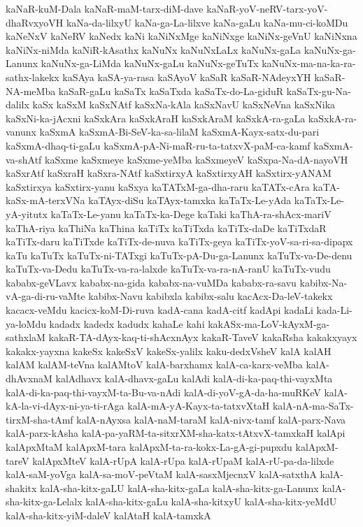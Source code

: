 {kaNaR-kuM-Dala
kaNaR-maM-tarx-diM-dave
kaNaR-yoV-neRV-tarx-yoV-dhaRvxyoVH
kaNa-da-lilxyU
kaNa-ga-La-lilxve
kaNa-gaLu
kaNa-mu-ci-koMDu
kaNeNxV
kaNeRV
kaNedx
kaNi
kaNiNxMge
kaNiNxge
kaNiNx-geVnU
kaNiNxna
kaNiNx-niMda
kaNiR-kAsathx
kaNuNx
kaNuNxLaLx
kaNuNx-gaLa
kaNuNx-ga-Lanunx
kaNuNx-ga-LiMda
kaNuNx-gaLu
kaNuNx-geTuTx
kaNuNx-ma-na-ka-ra-sathx-lakekx
kaSAya
kaSA-ya-rasa
kaSAyoV
kaSaR
kaSaR-NAdeyxYH
kaSaR-NA-meMba
kaSaR-gaLu
kaSaTx
kaSaTxda
kaSaTx-do-La-giduR
kaSaTx-gu-Na-dalilx
kaSx
kaSxM
kaSxNAtf
kaSxNa-kAla
kaSxNavU
kaSxNeVna
kaSxNika
kaSxNi-ka-jAcxni
kaSxkAra
kaSxkAraH
kaSxkAraM
kaSxkA-ra-gaLa
kaSxkA-ra-vanunx
kaSxmA
kaSxmA-Bi-SeV-ka-sa-lilaM
kaSxmA-Kayx-satx-du-pari
kaSxmA-dhaq-ti-gaLu
kaSxmA-pA-Ni-maR-ru-ta-tatxvX-paM-ca-kamf
kaSxmA-va-shAtf
kaSxme
kaSxmeye
kaSxme-yeMba
kaSxmeyeV
kaSxpa-Na-dA-nayoVH
kaSxrAtf
kaSxraH
kaSxra-NAtf
kaSxtirxyA
kaSxtirxyAH
kaSxtirx-yANAM
kaSxtirxya
kaSxtirx-yanu
kaSxya
kaTATxM-ga-dha-raru
kaTATx-cAra
kaTA-kaSx-mA-terxVNa
kaTAyx-diSu
kaTAyx-tamxka
kaTaTx-Le-yAda
kaTaTx-Le-yA-yitutx
kaTaTx-Le-yanu
kaTaTx-ka-Dege
kaTaki
kaThA-ra-shAcx-mariV
kaThA-riya
kaThiNa
kaThina
kaTiTx
kaTiTxda
kaTiTx-daDe
kaTiTxdaR
kaTiTx-daru
kaTiTxde
kaTiTx-de-nuva
kaTiTx-geya
kaTiTx-yoV-sa-ri-sa-dipapx
kaTu
kaTuTx
kaTuTx-ni-TATxgi
kaTuTx-pA-Du-ga-Lanunx
kaTuTx-va-De-denu
kaTuTx-va-Dedu
kaTuTx-va-ra-lalxde
kaTuTx-va-ra-nA-ranU
kaTuTx-vudu
kababx-geVLavx
kababx-na-gida
kababx-na-vuMDa
kababx-ra-savu
kabibx-Na-vA-ga-di-ru-vaMte
kabibx-Navu
kabibxla
kabibx-salu
kacAcx-Da-leV-takekx
kacacx-veMdu
kacicx-koM-Di-ruva
kadA-cana
kadA-citf
kadApi
kadaLi
kada-Li-ya-loMdu
kadadx
kadedx
kadudx
kahaLe
kahi
kakASx-ma-LoV-kAyxM-ga-sathxlaM
kakaR-TA-dAyx-kaq-ti-shAcxnAyx
kakaR-TaveV
kakaRsha
kakakxyayx
kakakx-yayxna
kakeSx
kakeSxV
kakeSx-yalilx
kaku-dedxVsheV
kalA
kalAH
kalAM
kalAM-teVna
kalAMtoV
kalA-barxhamx
kalA-ca-karx-veMba
kalA-dhAvxnaM
kalAdhavx
kalA-dhavx-gaLu
kalAdi
kalA-di-ka-paq-thi-vayxMta
kalA-di-ka-paq-thi-vayxM-ta-Bu-va-nAdi
kalA-di-yoV-gA-da-ha-muRKeV
kalA-kA-la-vi-dAyx-ni-ya-ti-rAga
kalA-mA-yA-Kayx-ta-tatxvXtaH
kalA-nA-ma-SaTx-tirxM-sha-tAmf
kalA-nAyxsa
kalA-naM-taraM
kalA-nivx-tamf
kalA-parx-Nava
kalA-parx-kAsha
kalA-pa-yaRM-ta-sitxrXM-sha-katx-tAtxvX-tamxkaH
kalApi
kalApxMtaM
kalApxM-tara
kalApxM-ta-ra-kokx-La-gA-gi-pupxdu
kalApxM-tareV
kalApxMteV
kalA-rUpA
kalA-rUpa
kalA-rUpaM
kalA-rU-pa-da-lilxde
kalA-saM-yoVga
kalA-sa-moV-peVtaM
kalA-sasxMjecnxV
kalA-satxthA
kalA-shakitx
kalA-sha-kitx-gaLU
kalA-sha-kitx-gaLa
kalA-sha-kitx-ga-Lanunx
kalA-sha-kitx-ga-Lelalx
kalA-sha-kitx-gaLu
kalA-sha-kitxyU
kalA-sha-kitx-yeMdU
kalA-sha-kitx-yiM-daleV
kalAtaH
kalA-tamxkA
}
